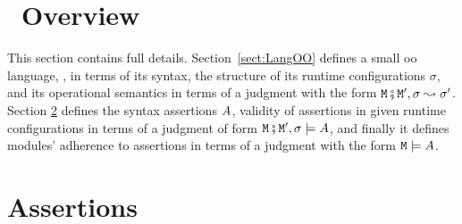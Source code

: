 \section{\Chainmail\ Overview}
\label{sect:chainmail}

This section contains full details. Section~\ref{sect:LangOO} defines a small oo language,  \LangOO, in terms of its  syntax, the structure of its runtime configurations $\sigma$, and its operational semantics in terms of a judgment with   the form ${\mbox{\tt{\ensuremath{{\mbox{\tt{M}}}}}}} \fatsemi {\mbox{\tt{\ensuremath{{\mbox{\tt{M}}}}}}}', \sigma \leadsto \sigma'$. Section \ref{sect:assertions} defines the syntax  assertions $A$,  validity of assertions in given runtime configurations  in terms of a judgment of form ${\mbox{\tt{\ensuremath{{\mbox{\tt{M}}}}}}} \fatsemi {\mbox{\tt{\ensuremath{{\mbox{\tt{M}}}}}}}', \sigma \models A$, and finally it
defines modules' adherence to assertions  in terms of a judgment with   the form ${\mbox{\tt{\ensuremath{{\mbox{\tt{M}}}}}}} \models A$.

 


\section{ Assertions}
\label{sect:assertions}

